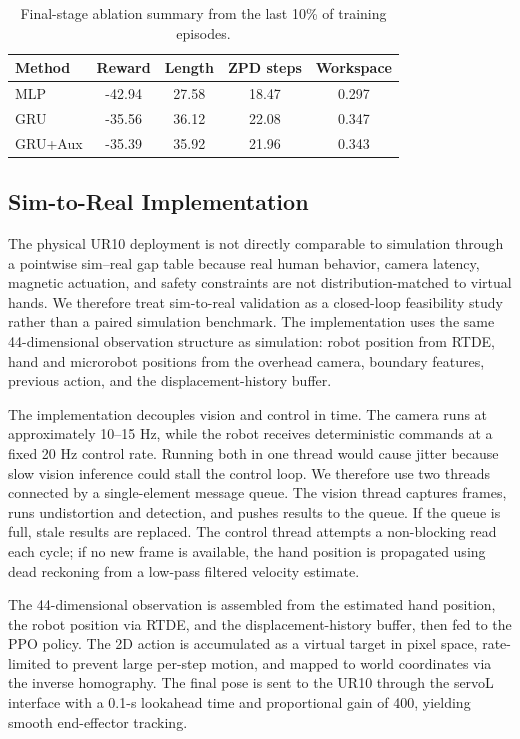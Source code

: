 \documentclass[lettersize,journal]{IEEEtran}
\begin{document}
\begin{table}[!t]
\caption{Final-stage ablation summary from the last 10\% of training episodes.}
\label{tab:ablation_summary}
\centering
\begin{tabular}{lcccc}
\hline
Method & Reward & Length & ZPD steps & Workspace \\
\hline
MLP & -42.94 & 27.58 & 18.47 & 0.297 \\
GRU & -35.56 & 36.12 & 22.08 & 0.347 \\
GRU+Aux & -35.39 & 35.92 & 21.96 & 0.343 \\
\hline
\end{tabular}
\end{table}

\subsection{Sim-to-Real Implementation}
The physical UR10 deployment is not directly comparable to simulation through a pointwise sim--real gap table because real human behavior, camera latency, magnetic actuation, and safety constraints are not distribution-matched to virtual hands. We therefore treat sim-to-real validation as a closed-loop feasibility study rather than a paired simulation benchmark. The implementation uses the same 44-dimensional observation structure as simulation: robot position from RTDE, hand and microrobot positions from the overhead camera, boundary features, previous action, and the displacement-history buffer.

The implementation decouples vision and control in time. The camera runs at approximately 10--15 Hz, while the robot receives deterministic commands at a fixed 20 Hz control rate. Running both in one thread would cause jitter because slow vision inference could stall the control loop. We therefore use two threads connected by a single-element message queue. The vision thread captures frames, runs undistortion and detection, and pushes results to the queue. If the queue is full, stale results are replaced. The control thread attempts a non-blocking read each cycle; if no new frame is available, the hand position is propagated using dead reckoning from a low-pass filtered velocity estimate.

The 44-dimensional observation is assembled from the estimated hand position, the robot position via RTDE, and the displacement-history buffer, then fed to the PPO policy. The 2D action is accumulated as a virtual target in pixel space, rate-limited to prevent large per-step motion, and mapped to world coordinates via the inverse homography. The final pose is sent to the UR10 through the servoL interface with a 0.1-s lookahead time and proportional gain of 400, yielding smooth end-effector tracking.
\end{document}
